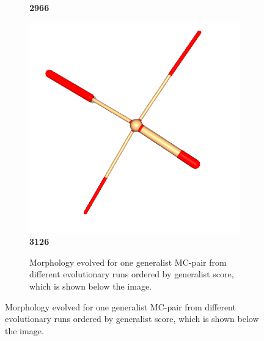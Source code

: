 \begin{figure}[!ht]
\begin{subfigure}{\textwidth}
\begin{minipage}{0.19\textwidth}
                    \textbf{2966}
                \end{minipage}
                \hfill
                \begin{minipage}{0.19\textwidth}
                    \centering
                    \includegraphics[width=\linewidth]{resources/generalist_5_3126/ant.png}
                    \textbf{3126}
                \end{minipage}

                \caption{Morphology evolved for one generalist MC-pair from different evolutionary runs ordered by generalist score, which is shown below the image.}
                \label{fig:gen_ant_images}
            \end{subfigure}
            

\end{figure}
